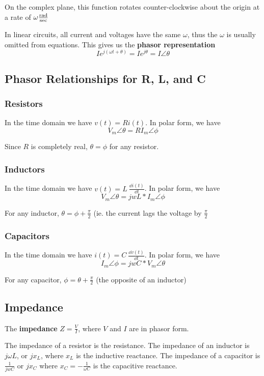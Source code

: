 \documentclass[12pt]{article}
\begin{document}
On the complex plane, this function rotates counter-clockwise about the origin at a rate of $\omega \frac{{\rm rad}}{{\rm sec}}$

In linear circuits, all current and voltages have the same $\omega$, thus the $\omega$ is usually omitted from equations. This gives us the {\bf phasor representation} \[ Ie^{j(\omega t + \theta)} = Ie^{j\theta} = I\angle\theta \]

\subsection*{Phasor Relationships for R, L, and C}
\subsubsection*{Resistors}
In the time domain we have $v(t) = Ri(t)$. In polar form, we have \[ V_m\angle\theta = RI_m\angle\phi \]

Since $R$ is completely real, $\theta = \phi$ for any resistor.

\subsubsection*{Inductors}
In the time domain we have $v(t) = L\ \frac{\dd i(t)}{\dd t}$. In polar form, we have \[ V_m\angle\theta = jwL * I_m\angle\phi \]

For any inductor, $\theta = \phi + \frac{\pi}{2}$ (ie. the current lags the voltage by $\frac{\pi}{2}$

\subsubsection*{Capacitors}
In the time domain we have $i(t) = C\ \frac{\dd v(t)}{\dd t}$. In polar form, we have \[ I_m\angle\phi = jwC * V_m\angle\theta \]

For any capacitor, $\phi = \theta + \frac{\pi}{2}$ (the opposite of an inductor)

\subsection*{Impedance}
The {\bf impedance} $Z = \frac{V}{I}$, where $V$ and $I$ are in phasor form.

The impedance of a resistor is the resistance. The impedance of an inductor is $j\omega L$, or $jx_L$, where $x_L$ is the inductive reactance. The impedance of a capacitor is $\frac{1}{jwC}$ or $jx_C$ where $x_C = -\frac{1}{\omega C}$ is the capacitive reactance.
\end{document}
